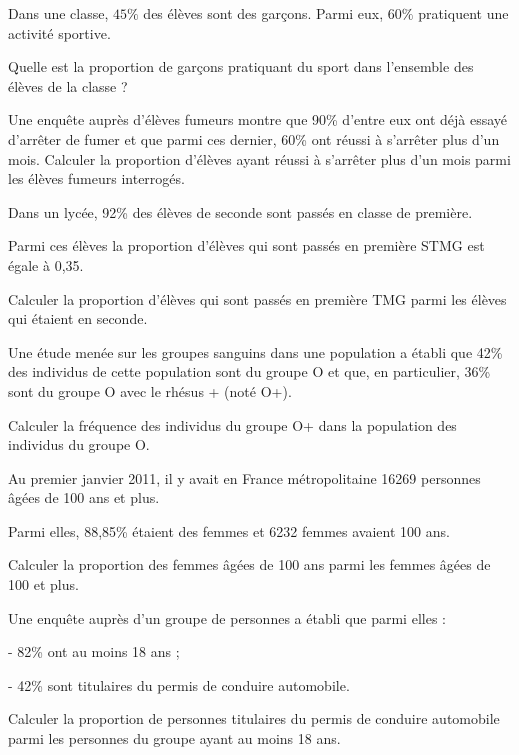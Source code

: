 \exo

 Dans une classe, $45\%$ des élèves sont des garçons. Parmi eux, $60\%$ pratiquent une activité sportive. 

Quelle est la proportion de garçons pratiquant du sport dans l'ensemble des élèves de la classe ?

\medskip

\exo 

Une enquête auprès d'élèves fumeurs montre que 90\% d'entre eux ont déjà essayé d'arrêter de fumer et que parmi ces dernier, 60\% ont réussi à s'arrêter plus d'un mois. Calculer la proportion d'élèves ayant réussi à s'arrêter plus d'un mois parmi les élèves fumeurs interrogés.

\medskip

\exo 

Dans un lycée, 92\% des élèves de seconde sont passés en classe de première.

Parmi ces élèves la proportion d'élèves qui sont passés en première STMG est égale à 0,35.

Calculer la proportion d'élèves qui sont passés en première TMG parmi les élèves qui étaient en seconde.

\medskip


\exo 

Une étude menée sur les groupes sanguins dans une population a établi que 42\% des individus de cette population sont du groupe O et que, en particulier, 36\% sont du groupe O avec le rhésus + (noté O+).

Calculer la fréquence des individus du groupe O+ dans la population des individus du groupe O.

\medskip

\exo

Au premier janvier 2011, il y avait en France métropolitaine 16269 personnes âgées de 100 ans et plus.

Parmi elles, 88,85\% étaient des femmes et 6232 femmes avaient 100 ans.

Calculer la proportion des femmes âgées de 100 ans parmi les femmes âgées de 100 et plus.

\medskip

\exo 

Une enquête auprès d'un groupe de personnes a établi que parmi elles :

- 82\% ont au moins 18 ans ;

- 42\% sont titulaires du permis de conduire automobile.

Calculer la proportion de personnes titulaires du permis de conduire automobile parmi les personnes du groupe ayant au moins 18 ans.


